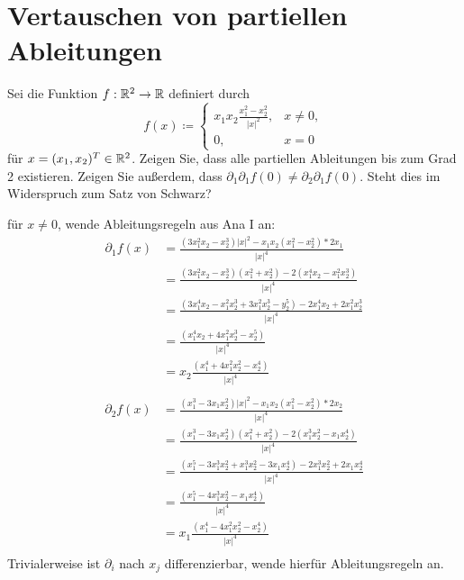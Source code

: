 \documentclass[sectionformat=aufgabe]{gadsescript}
\begin{document}



\section{Vertauschen von partiellen Ableitungen}
Sei die Funktion $ f : \mathbb{R} ^2 \to \mathbb{R}  $ definiert durch
\[
	f(x) \coloneqq 
	\begin{cases}
		x_1x_2 \frac{x_1^2 - x_2^2}{ \left| x \right| ^2 } , & x \neq 0,\\
		0, & x = 0
	\end{cases}
\]
für $ x = (x_1, x_2)^T \in \mathbb{R} ^2 $. Zeigen Sie, dass alle partiellen Ableitungen bis zum Grad 2 existieren.
Zeigen Sie außerdem, dass $ \partial_1 \partial_1 f(0) \neq \partial_2 \partial_1 f(0) $.
Steht dies im Widerspruch zum Satz von Schwarz?

für $ x \neq 0 $, wende Ableitungsregeln aus Ana I an:
\begin{align*}
	\partial_1 f(x) &= \frac{ ( 3x_1^2 x_2 - x_2^3 ) \left| x \right| ^2 - x_1x_2(x_1^2 - x_2^2) * 2x_1 }{ \left| x \right| ^4 } \\
	~&= \frac{ ( 3x_1^2 x_2 - x_2^3 ) (x_1^2 + x_2^2) - 2(x_1^4x_2 - x_1^2x_2^3) }{ \left| x \right| ^4 } \\
	~&= \frac{ ( 3x_1^4 x_2 - x_1^2x_2^3 + 3x_1^2x_2^3 - y_2^5 ) - 2x_1^4x_2 + 2x_1^2x_2^3 }{ \left| x \right| ^4 } \\
	~&= \frac{ (  x_1^4 x_2 + 4x_1^2x_2^3 - x_2^5 ) }{ \left| x \right| ^4 } \\
	~&= x_2 \frac{ (  x_1^4 + 4x_1^2x_2^2 - x_2^4 ) }{ \left| x \right| ^4 } \\
\end{align*}
\begin{align*}
	\partial_2 f(x) &= \frac{ ( x_1^3 - 3x_1x_2^2 ) \left| x \right| ^2 - x_1x_2(x_1^2 - x_2^2) * 2x_2 }{ \left| x \right| ^4 } \\
	~&= \frac{ ( x_1^3 - 3x_1x_2^2 ) (x_1^2 + x_2^2) - 2(x_1^3x_2^2 - x_1x_2^4) }{ \left| x \right| ^4 } \\
	~&= \frac{ ( x_1^5 - 3x_1^3x_2^2 + x_1^3x_2^2 - 3x_1x_2^4 ) - 2x_1^3x_2^2 + 2x_1x_2^4 }{ \left| x \right| ^4 } \\
	~&= \frac{ ( x_1^5 - 4x_1^3x_2^2 - x_1x_2^4 ) }{ \left| x \right| ^4 } \\
	~&= x_1 \frac{ (  x_1^4 - 4x_1^2x_2^2 - x_2^4 ) }{ \left| x \right| ^4 } \\
\end{align*}
Trivialerweise ist $ \partial_i $ nach $ x_j $ differenzierbar, wende hierfür Ableitungsregeln an.
\end{document}
